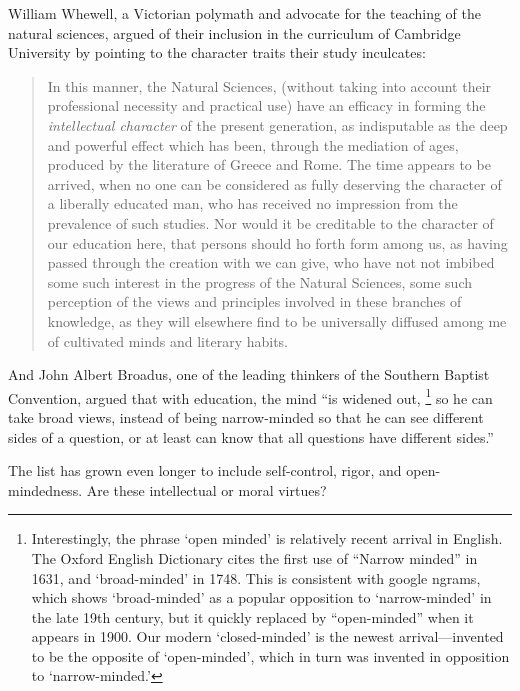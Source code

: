 William Whewell, a Victorian polymath and advocate for the teaching of the natural sciences, argued of their inclusion in the curriculum of Cambridge University by pointing to the character traits their study inculcates:

\begin{quote}

In this manner, the Natural Sciences, (without taking into account their professional necessity and practical use) have an efficacy in forming the \emph{intellectual character} of the present generation, as indisputable as the deep and powerful effect which has been, through the mediation of ages, produced by the literature of Greece and Rome. The time appears to be arrived, when no one can be considered as fully deserving the character of a liberally educated man, who has received no impression from the prevalence of such studies. Nor would it be creditable to the character of our education here, that persons should ho forth form among us, as having passed through the creation with we can give, who have not not imbibed some such interest in the progress of the Natural Sciences, some such perception of the views and principles involved in these branches of knowledge, as they will elsewhere find to be universally diffused among me of cultivated minds and literary habits. ~\citep[p. 208--9, italics mine]{Rose:1831uf}
\end{quote}

And John Albert Broadus, one of the leading thinkers of the Southern Baptist Convention, argued that with education, the mind ``is widened out, \footnote{Interestingly, the phrase `open minded' is relatively recent arrival in English. The Oxford English Dictionary cites the first use of ``Narrow minded'' in 1631, and `broad-minded' in 1748. This is consistent with google ngrams, which shows `broad-minded' as a popular opposition to `narrow-minded' in the late 19th century, but it quickly replaced by ``open-minded'' when it appears in 1900. Our modern `closed-minded' is the newest arrival---invented to be the opposite of `open-minded', which in turn was invented in opposition to `narrow-minded.'} so he can take broad views, instead of being narrow-minded so that he can see different sides of a question, or at least can know that all questions have different sides.'' ~\citep[p. 252--253]{Broadus:1891vk}

The list has grown even longer to include self-control, rigor, and open-mindedness. Are these intellectual or moral virtues? 

